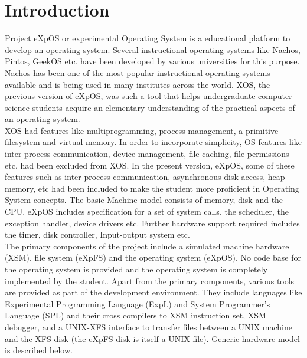 \chapter{Introduction}
\label{chap2}

Project eXpOS or experimental Operating System is a educational platform to develop an operating system. Several instructional operating systems like Nachos, Pintos, GeekOS etc. have been developed by various universities for this purpose.
Nachos has been one of the most popular instructional operating systems available and is being used in many institutes across the world. XOS, the previous version of eXpOS, was such a tool that helps undergraduate computer science students acquire an elementary understanding of the practical aspects of an operating system.
\\
XOS had features like multiprogramming, process management, a primitive filesystem and virtual memory. In order to incorporate simplicity, OS features like inter-process communication, device management, file caching, file permissions etc. had been excluded from XOS. In the present version, eXpOS, some of these features such as inter process communication, asynchronous disk access, heap memory, etc had been included to make the student more proficient in Operating System concepts. The basic Machine model consists of memory, disk and the CPU. eXpOS includes specification for a set of system calls, the scheduler, the exception handler, device drivers etc.  Further hardware support required includes the timer, disk controller, Input-output system etc.
\\
The primary components of the project include a simulated machine hardware (XSM), file system (eXpFS) and the operating system (eXpOS). No code base for the operating system is provided and the operating system is completely implemented by the student. Apart from the primary components, various tools are provided as part of the development environment. They include languages like Experimental Programming Language (ExpL) and System Programmer's Language (SPL) and their cross compilers to XSM instruction set, XSM debugger, and a UNIX-XFS interface to transfer files between a UNIX machine and the XFS disk (the eXpFS disk is itself a UNIX file). Generic hardware model is described below.

